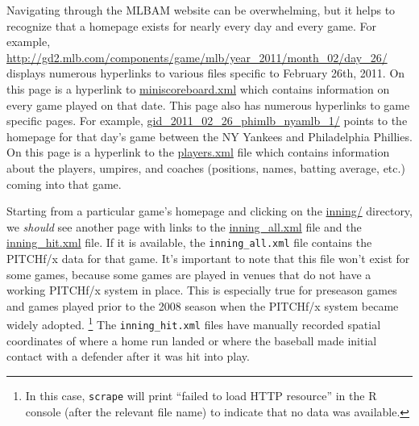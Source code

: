 \documentclass[12pt,]{isuthesis}
\let\rmarkdownfootnote\footnote%
\def\footnote{\protect\rmarkdownfootnote}
\begin{document}
Navigating through the MLBAM website can be overwhelming, but it helps
to recognize that a homepage exists for nearly every day and every game.
For example,
\url{http://gd2.mlb.com/components/game/mlb/year_2011/month_02/day_26/}
displays numerous hyperlinks to various files specific to February 26th,
2011. On this page is a hyperlink to
\href{http://gd2.mlb.com/components/game/mlb/year_2011/month_02/day_26/miniscoreboard.xml}{miniscoreboard.xml}
which contains information on every game played on that date. This page
also has numerous hyperlinks to game specific pages. For example,
\href{http://gd2.mlb.com/components/game/mlb/year_2011/month_02/day_26/gid_2011_02_26_phimlb_nyamlb_1/}{gid\_2011\_02\_26\_phimlb\_nyamlb\_1/}
points to the homepage for that day's game between the NY Yankees and
Philadelphia Phillies. On this page is a hyperlink to the
\href{http://gd2.mlb.com/components/game/mlb/year_2011/month_02/day_26/gid_2011_02_26_phimlb_nyamlb_1/players.xml}{players.xml}
file which contains information about the players, umpires, and coaches
(positions, names, batting average, etc.) coming into that game.

Starting from a particular game's homepage and clicking on the
\href{http://gd2.mlb.com/components/game/mlb/year_2011/month_02/day_26/gid_2011_02_26_phimlb_nyamlb_1/inning/}{inning/}
directory, we \emph{should} see another page with links to the
\href{http://gd2.mlb.com/components/game/mlb/year_2011/month_02/day_26/gid_2011_02_26_phimlb_nyamlb_1/inning/inning_all.xml}{inning\_all.xml}
file and the
\href{http://gd2.mlb.com/components/game/mlb/year_2011/month_02/day_26/gid_2011_02_26_phimlb_nyamlb_1/inning/inning_hit.xml}{inning\_hit.xml}
file. If it is available, the \texttt{inning\_all.xml} file contains the
PITCHf/x data for that game. It's important to note that this file won't
exist for some games, because some games are played in venues that do
not have a working PITCHf/x system in place. This is especially true for
preseason games and games played prior to the 2008 season when the
PITCHf/x system became widely adopted.
\footnote{In this case, \texttt{scrape} will print ``failed to load HTTP resource''
in the R console (after the relevant file name) to indicate that no
data was available.
} The \texttt{inning\_hit.xml} files have manually recorded spatial
coordinates of where a home run landed or where the baseball made
initial contact with a defender after it was hit into play.
\end{document}
